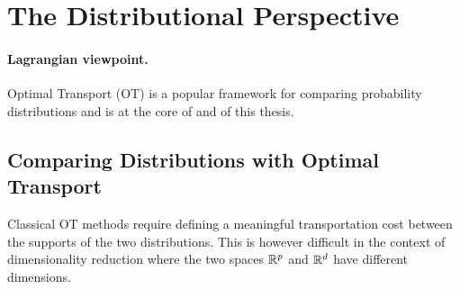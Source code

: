 \section{The Distributional Perspective}\label{sec:dist_perspective_dr}


\paragraph{Lagrangian viewpoint.}

Optimal Transport (OT) \citep{villani2009optimal,peyre2019computational} is a popular
framework for comparing probability distributions and is at the core of  and  of this thesis.

\subsection{Comparing Distributions with Optimal Transport}\label{sec:background_ot}


Classical OT methods require defining a meaningful transportation cost between the supports of the two distributions. 
This is however difficult in the context of dimensionality reduction where the two spaces $\mathbb{R}^p$ and $\mathbb{R}^d$ have different dimensions.


